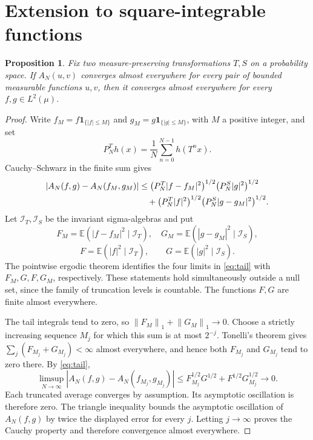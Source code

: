 \documentclass[11pt,a4paper]{article}
\newtheorem{proposition}[theorem]{Proposition}
\theoremstyle{definition}
\newenvironment{statementframe}
  {\par\addvspace{4pt}\noindent
   \setlength{\fboxsep}{6pt}\setlength{\fboxrule}{0.45pt}%
   \begin{lrbox}{\statementbox}%
   \begin{minipage}{\dimexpr\linewidth-2\fboxsep-2\fboxrule\relax}}
  {\end{minipage}\end{lrbox}%
   \fbox{\usebox{\statementbox}}\par\addvspace{4pt}}
\newcommand{\1}{\mathbf1}
\newcommand{\E}{\mathbb E}
\newcommand{\norm}[1]{\left\lVert #1\right\rVert}
\begin{document}
\section{Extension to square-integrable functions}

\begin{statementframe}
\begin{proposition}\label{prop:l2}
Fix two measure-preserving transformations $T,S$ on a probability space.
If $A_N(u,v)$ converges almost everywhere for every pair of bounded
measurable functions $u,v$, then it converges almost everywhere for
every $f,g\in L^2(\mu)$.
\end{proposition}
\end{statementframe}
\begin{proof}
Write $f_M=f\1_{\{|f|\le M\}}$ and $g_M=g\1_{\{|g|\le M\}}$, with
$M$ a positive integer, and set
\[
 P_N^Th(x)=\frac1N\sum_{n=0}^{N-1}h(T^nx).
\]
Cauchy--Schwarz in the finite sum gives
\begin{align}\label{eq:tail}
 |A_N(f,g)-A_N(f_M,g_M)|
 &\le \bigl(P_N^T|f-f_M|^2\bigr)^{1/2}
          \bigl(P_N^S|g|^2\bigr)^{1/2}\notag\\
 &\quad+\bigl(P_N^T|f|^2\bigr)^{1/2}
          \bigl(P_N^S|g-g_M|^2\bigr)^{1/2}.
\end{align}
Let $\mathcal I_T,\mathcal I_S$ be the invariant sigma-algebras and put
\[
 F_M=\E(|f-f_M|^2\mid\mathcal I_T),\quad
 G_M=\E(|g-g_M|^2\mid\mathcal I_S),
\]
\[
 F=\E(|f|^2\mid\mathcal I_T),\qquad
 G=\E(|g|^2\mid\mathcal I_S).
\]
The pointwise ergodic theorem identifies the four limits in
\eqref{eq:tail} with $F_M,G,F,G_M$, respectively. These statements
hold simultaneously outside a null set, since the family of truncation
levels is countable. The functions $F,G$ are finite almost everywhere.

The tail integrals tend to zero, so
$\norm{F_M}_1+\norm{G_M}_1\to0$. Choose a strictly increasing sequence
$M_j$ for which this sum is at most $2^{-j}$. Tonelli's theorem gives
$\sum_j(F_{M_j}+G_{M_j})<\infty$ almost everywhere, and hence both
$F_{M_j}$ and $G_{M_j}$ tend to zero there. By \eqref{eq:tail},
\[
 \limsup_{N\to\infty}|A_N(f,g)-A_N(f_{M_j},g_{M_j})|
 \le F_{M_j}^{1/2}G^{1/2}+F^{1/2}G_{M_j}^{1/2}
 \longrightarrow0.
\]
Each truncated average converges by assumption. Its asymptotic
oscillation is therefore zero. The triangle inequality bounds the
asymptotic oscillation of $A_N(f,g)$ by twice the displayed error for
every $j$. Letting $j\to\infty$ proves the Cauchy property and therefore
convergence almost everywhere.
\end{proof}
\end{document}
